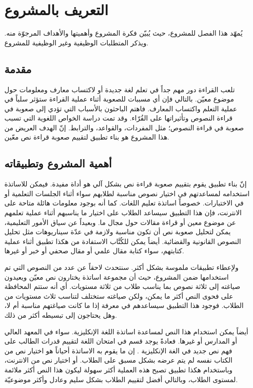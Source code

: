 

\chapter{التعريف بالمشروع}
يُمهّد هذا الفصل للمشروع، حيث يُبيّن فكرة المشروع وأهميتها والأهداف المرجوّة منه. ويذكر المتطلبات الوظيفية وغير الوظيفية للمشروع.


\section{مقدمة}
تلعب القراءة دور مهم جداً في تعلم لغة جديدة أو لاكتساب معارف ومعلومات حول موضوع معيّن.
بالتالي فإن أي مسببات للصعوبة أثناء عملية القراءة ستؤثر سلباً في عملية التعلم واكتساب المعارف.
فاهتم الباحثون بالأسباب التي تؤدي إلى صعوبة في قراءة النصوص وتأثيراتها على القُرّاء.
وقد تمت دراسة الخواص اللغوية التي تسبب صعوبة في قراءة النصوص؛
مثل المفردات، والقواعد، والترابط.
إنّ الهدف العريض من هذا المشروع هو بناء تطبيق لتقييم صعوبة قراءة نص معّين.

\section{أهمية المشروع وتطبيقاته}
إنّ بناء تطبيق يقوم بتقييم صعوبة قراءة نص بشكل آلي هو أداة مفيدة.
فيمكن للاساتذة استخدامه لمساعدتهم في اختيار نصوص مناسبة لطلابهم سواء أثناء الجلسات التعلمية أو في الاختبارات.
خصوصاً اساتذة تعليم اللغات.
كما أنه بوجود معلومات هائلة متاحة على الانترنت،
فإن هذا التطبيق سيساعد الطلاب على اختيار ما يناسبهم أثناء عملية تعلمهم عن موضوع معين أو قراءة مقالات حول مجال ما.
وبعيداً عن سياق الأمور التعليمية،
يمكن لتحليل صعوبة نص أن تكون مناسبة ولازمة في عدّة سيناريوهات مثل تحليل النصوص القانونية والقضائية.
أيضاً يمكن للكُتَّاب الاستفادة من هكذا تطبيق أثناء عملية كتابتهم، سواء كتابة مقال علمي أو مقال صحفي أو خبر أو غيرها.

ولإعطاء تطبيقات ملموسة بشكل أكثر.
سنتحدث لاحقاً عن عدد من النصوص التي تم استخدامها ضمن المشروع،
حيث أن مجموعة اساتذة يختارون نص معيّن ويعيدون صياغته إلى ثلاثة نصوص بما يناسب طلاب من ثلاثة مستويات.
أي أنه ستتم المحافظة على فحوى النص أكثر ما يمكن، ولكن صياغته ستختلف لتناسب ثلاث مستويات من الطلاب.
فوجود هذا التطبيق سيساعدهم في معرفة إذا ما كانت صياغتهم مناسبة أم لا، وهل يحتاجون إلى تبسيطه أكثر من ذلك.

أيضاً يمكن استخدام هذا النص لمساعدة اساتذة اللغة الإنكليزية.
سواء في المعهد العالي أو المدارس أو غيرها.
فعادةً يوجد قسم في امتحان اللغة لتقييم قدرات الطالب على فهم نص جديد في الغة الإنكليزية .
إن ما يقوم به الاساتذة أحياناً هو اختيار نص من الكتاب نفسه لم يتم عرضه بشكل مسبق على الطلاب.
أو اختيار نص من الانترنت، وباستخدام هكذا تطبيق تصبح هذه العملية أكثر سهولة ليكون هذا النص أكثر ملائمة لمستوى الطلاب،
وبالتالي أفضل لتقييم الطلاب بشكل سليم وعادل وأكثر موضوعيّة.

